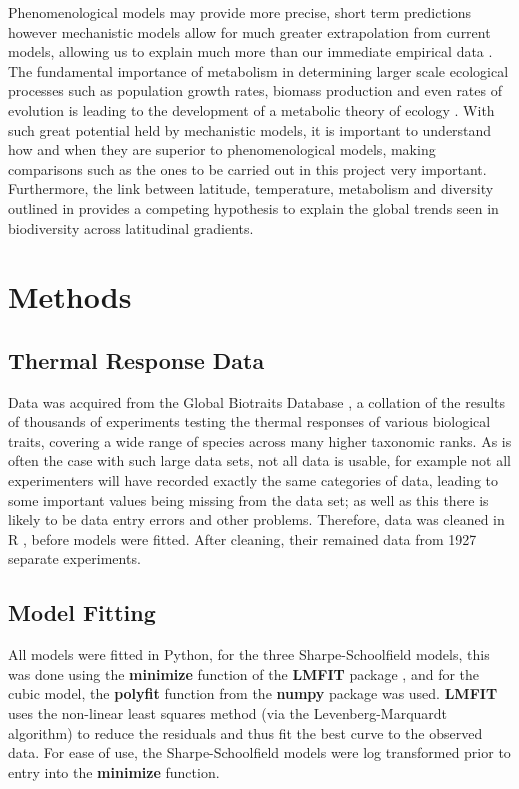 \documentclass[a4paper, 11pt]{article}
\begin{document}
\begin{linenumbers}
Phenomenological models may provide more precise, short term predictions however mechanistic models allow for much greater extrapolation from current models, allowing us to explain much more than our immediate empirical data  \citep{modelMisuse}. The fundamental importance of metabolism  in determining larger scale ecological processes such as population growth rates, biomass production and even rates of evolution is leading to the development of a metabolic theory of ecology \citep{metabTheory}. With such great potential held by mechanistic models, it is important to understand how and when they are superior to phenomenological models, making comparisons such as the ones to be carried out in this project very important. Furthermore, the link between latitude, temperature, metabolism and diversity outlined in \cite{metabTheory} provides a competing hypothesis to explain the global trends seen in biodiversity across latitudinal gradients.


\section{Methods}

\subsection{Thermal Response Data}

Data was acquired from the Global Biotraits Database \citep{biotraitsDB}, a collation of the results of thousands of experiments testing the thermal responses of various biological traits, covering a wide range of species across many higher taxonomic ranks. As is often the case with such large data sets, not all data is usable, for example not all experimenters will have recorded exactly the same categories of data, leading to some important values being missing from the data set; as well as this there is likely to be data entry errors and other problems. Therefore, data was cleaned in R \citep{R}, before models were fitted. After cleaning, their remained data from 1927 separate experiments.

\subsection{Model Fitting}

All models were fitted in Python, for the three Sharpe-Schoolfield models, this was done using the \textbf{minimize} function of the \textbf{LMFIT} package \citep{LMFIT}, and for the cubic model, the \textbf{polyfit} function from the \textbf{numpy} package \citep{numpy} was used. \textbf{LMFIT} uses the non-linear least squares method (via the Levenberg-Marquardt algorithm) to reduce the residuals and thus fit the best curve to the observed data. For ease of use, the Sharpe-Schoolfield models were log transformed prior to entry into the \textbf{minimize} function. 


\end{linenumbers}
\end{document}
